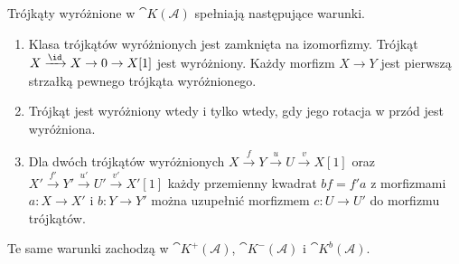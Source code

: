 \begin{stwierdzenie}[Warunki TR1--TR3]\label{cat:prop:tr-123}
Trójkąty wyróżnione w $\cat{K}(\mathcal A)$ spełniają następujące warunki.
\begin{enumerate}[label=\textup{(TR\arabic*)}]
 \item Klasa trójkątów wyróżnionych jest zamknięta na izomorfizmy. Trójkąt $X\xrightarrow{\id}X\to0\to X[1]$ jest wyróżniony. Każdy morfizm $X\to Y$ jest pierwszą strzałką pewnego trójkąta wyróżnionego.
 \item Trójkąt jest wyróżniony wtedy i tylko wtedy, gdy jego rotacja w przód jest wyróżniona.
 \item Dla dwóch trójkątów wyróżnionych $X\xrightarrow f Y\xrightarrow u U\xrightarrow v X[1]$ oraz $X'\xrightarrow{f'}Y'\xrightarrow{u'}U'\xrightarrow{v'}X'[1]$ każdy przemienny kwadrat $bf=f'a$ z morfizmami $a:X\to X'$ i $b:Y\to Y'$ można uzupełnić morfizmem $c:U\to U'$ do morfizmu trójkątów.
\end{enumerate}
Te same warunki zachodzą w $\cat{K}^+(\mathcal A)$, $\cat{K}^-(\mathcal A)$ i $\cat{K}^b(\mathcal A)$.
\end{stwierdzenie}
